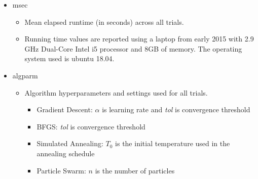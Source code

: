\documentclass{vgtc}                          %
\begin{document}
\begin{itemize}
\begin{itemize}
\end{itemize}
\item msec
\begin{itemize}
	\item Mean elapsed runtime (in seconds) across all trials.
    \item Running time values are reported using a laptop from early 2015 with 2.9 GHz Dual-Core Intel i5 processor and 8GB of memory. The operating system used is ubuntu 18.04.
\end{itemize}
\item algparm
\begin{itemize}
	\item Algorithm hyperparameters and settings used for all trials.
	\begin{itemize}
		\item Gradient Descent: $\alpha$ is learning rate and \emph{tol} is convergence threshold
		\item BFGS: \emph{tol} is convergence threshold
		\item Simulated Annealing: $T_0$ is the initial temperature used in the annealing schedule
		\item Particle Swarm: $n$ is the number of particles
	\end{itemize}
\end{itemize}
\end{itemize}
\end{document}
